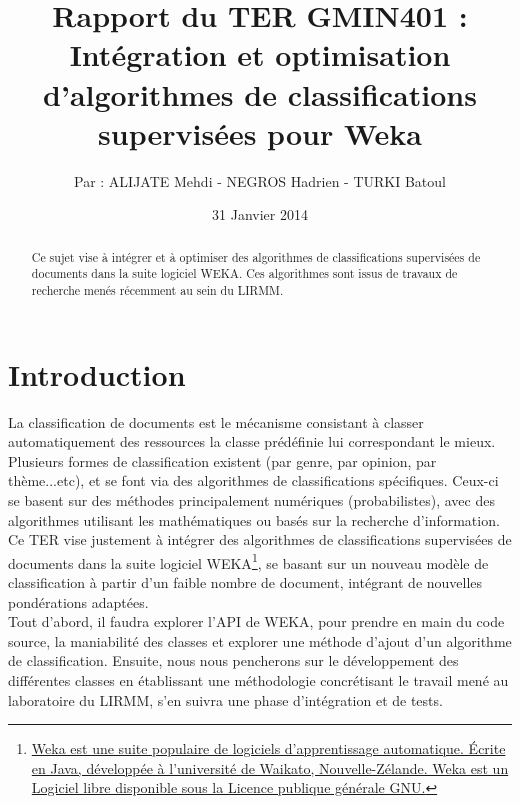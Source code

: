 \documentclass{article}
\title{Rapport du TER GMIN401 :\\ \textbf{Intégration et optimisation d’algorithmes de classifications supervisées pour Weka}}
\author{Par : ALIJATE Mehdi - NEGROS Hadrien - TURKI Batoul}
\date{31 Janvier 2014}
\begin{document}
\maketitle
\tableofcontents

\begin{abstract}
	
Ce sujet vise à intégrer et à optimiser des algorithmes de classifications supervisées de documents dans la suite logiciel WEKA. Ces algorithmes sont issus de travaux de recherche menés récemment au sein du LIRMM.
\end{abstract}

\newpage 
\section{Introduction}\label{sec:intro}
La classification de documents est le mécanisme consistant à classer automatiquement des ressources la classe prédéfinie lui correspondant le mieux.\\
Plusieurs formes de classification existent (par genre, par opinion, par thème...etc), et se font via des algorithmes de classifications spécifiques. Ceux-ci se basent sur des méthodes principalement numériques (probabilistes), avec des algorithmes utilisant les mathématiques ou basés sur la recherche d'information. \\
Ce TER vise justement à intégrer des algorithmes de classifications supervisées de documents dans la suite logiciel WEKA\footnote{\href{http://www.cs.waikato.ac.nz/~ml/weka/}{Weka est une suite populaire de logiciels d'apprentissage automatique. Écrite en Java, développée à l'université de Waikato, Nouvelle-Zélande. Weka est un Logiciel libre disponible sous la Licence publique générale GNU.}}, se basant sur un nouveau modèle de classification à partir d'un faible nombre de document, intégrant de nouvelles pondérations adaptées.\\
Tout d'abord, il faudra explorer l'API de WEKA, pour prendre en main du code source, la maniabilité des classes et explorer une méthode d'ajout d'un algorithme de classification. Ensuite, nous nous pencherons sur le développement des différentes classes en établissant une méthodologie concrétisant le travail mené au laboratoire du LIRMM, s'en suivra une phase d'intégration et de tests.



\end{document}
